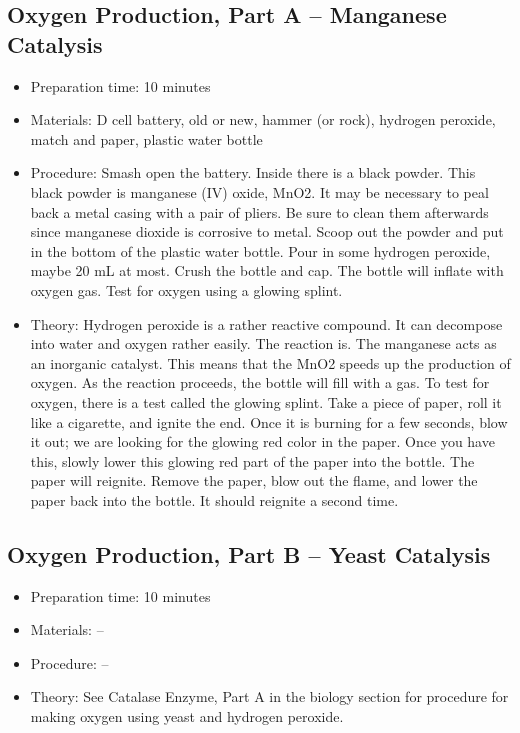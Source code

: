 \subsection{Oxygen Production, Part A – Manganese Catalysis}
\begin{itemize}
\item{Preparation time: 10 minutes}
\item{Materials: D cell battery, old or new, hammer (or rock), hydrogen peroxide, match and paper, plastic water bottle}
\item{Procedure: Smash open the battery. Inside there is a black powder. This black powder is manganese (IV) oxide, MnO2. It may be necessary to peal back a metal casing with a pair of pliers. Be sure to clean them afterwards since manganese dioxide is corrosive to metal. Scoop out the powder and put in the bottom of the plastic water bottle. Pour in some hydrogen peroxide, maybe 20 mL at most. Crush the bottle and cap. The bottle will inflate with oxygen gas. Test for oxygen using a glowing splint.}
\item{Theory: Hydrogen peroxide is a rather reactive compound. It can decompose into water and oxygen rather easily. The reaction is. The manganese acts as an inorganic catalyst. This means that the MnO2 speeds up the production of oxygen. As the reaction proceeds, the bottle will fill with a gas. To test for oxygen, there is a test called the glowing splint. Take a piece of paper, roll it like a cigarette, and ignite the end. Once it is burning for a few seconds, blow it out; we are looking for the glowing red color in the paper. Once you have this, slowly lower this glowing red part of the paper into the bottle. The paper will reignite. Remove the paper, blow out the flame, and lower the paper back into the bottle. It should reignite a second time.}
\end{itemize}

\subsection{Oxygen Production, Part B – Yeast Catalysis}
\begin{itemize}
\item{Preparation time: 10 minutes}
\item{Materials: --}
\item{Procedure: --}
\item{Theory: See Catalase Enzyme, Part A in the biology section for procedure for making oxygen using yeast and hydrogen peroxide. }
\end{itemize}

